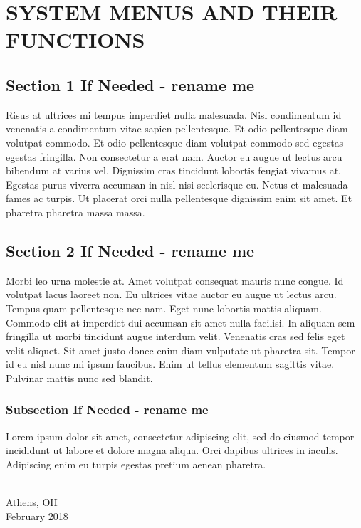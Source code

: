 \chapter{SYSTEM MENUS AND THEIR FUNCTIONS}

\section{Section 1 If Needed  - rename me}
Risus at ultrices mi tempus imperdiet nulla malesuada. Nisl condimentum id venenatis a condimentum vitae sapien pellentesque. Et odio pellentesque diam volutpat commodo. Et odio pellentesque diam volutpat commodo sed egestas egestas fringilla. Non consectetur a erat nam. Auctor eu augue ut lectus arcu bibendum at varius vel. Dignissim cras tincidunt lobortis feugiat vivamus at. Egestas purus viverra accumsan in nisl nisi scelerisque eu. Netus et malesuada fames ac turpis. Ut placerat orci nulla pellentesque dignissim enim sit amet. Et pharetra pharetra massa massa.

\section{Section 2 If Needed  - rename me}
Morbi leo urna molestie at. Amet volutpat consequat mauris nunc congue. Id volutpat lacus laoreet non. Eu ultrices vitae auctor eu augue ut lectus arcu. Tempus quam pellentesque nec nam. Eget nunc lobortis mattis aliquam. Commodo elit at imperdiet dui accumsan sit amet nulla facilisi. In aliquam sem fringilla ut morbi tincidunt augue interdum velit. Venenatis cras sed felis eget velit aliquet. Sit amet justo donec enim diam vulputate ut pharetra sit. Tempor id eu nisl nunc mi ipsum faucibus. Enim ut tellus elementum sagittis vitae. Pulvinar mattis nunc sed blandit.

\subsection{Subsection If Needed  - rename me}
Lorem ipsum dolor sit amet, consectetur adipiscing elit, sed do eiusmod tempor incididunt ut labore et dolore magna aliqua. Orci dapibus ultrices in iaculis. Adipiscing enim eu turpis egestas pretium aenean pharetra. 


\vspace*{\fill}
{ \\ Athens, OH \\ February 2018\par}
